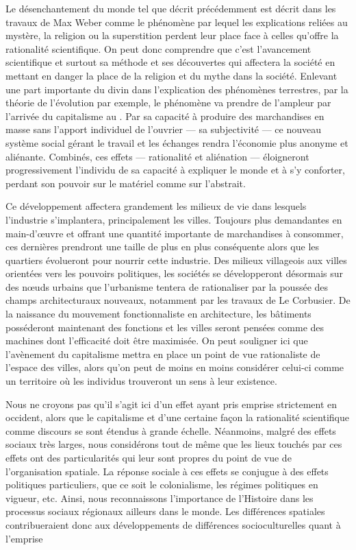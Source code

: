 Le désenchantement du monde tel que décrit précédemment est décrit dans les travaux de Max Weber comme le phénomène par lequel les explications reliées au mystère, la religion ou la superstition perdent leur place face à celles qu'offre la rationalité scientifique.
On peut donc comprendre que c'est l'avancement scientifique et surtout sa méthode et ses découvertes qui affectera la société en mettant en danger la place de la religion et du mythe dans la société.
Enlevant une part importante du divin dans l'explication des phénomènes terrestres, par la théorie de l'évolution par exemple, le phénomène va prendre de l'ampleur par l'arrivée du capitalisme au .
Par sa capacité à produire des marchandises en masse sans l'apport individuel de l'ouvrier --- sa subjectivité --- ce nouveau système social gérant le travail et les échanges rendra l'économie plus anonyme et aliénante.
Combinés, ces effets --- rationalité et aliénation --- éloigneront progressivement l'individu de sa capacité à expliquer le monde et à s'y conforter, perdant son pouvoir sur le matériel comme sur l'abstrait.

Ce développement affectera grandement les milieux de vie dans lesquels l'industrie s'implantera, principalement les villes.
Toujours plus demandantes en main-d’œuvre et offrant une quantité importante de marchandises à consommer, ces dernières prendront une taille de plus en plus conséquente alors que les quartiers évolueront pour nourrir cette industrie.
Des milieux villageois aux villes orientées vers les pouvoirs politiques, les sociétés se développeront désormais sur des nœuds urbains que l'urbanisme tentera de rationaliser par la poussée des champs architecturaux nouveaux, notamment par les travaux de Le Corbusier.
De la naissance du mouvement fonctionnaliste en architecture, les bâtiments posséderont maintenant des fonctions et les villes seront pensées comme des machines dont l'efficacité doit être maximisée\missref{}.
On peut souligner ici que l'avènement du capitalisme mettra en place un point de vue rationaliste de l'espace des villes, alors qu'on peut de moins en moins considérer celui-ci comme un territoire où les individus trouveront un sens à leur existence.

Nous ne croyons pas qu'il s'agit ici d'un effet ayant pris emprise strictement en occident, alors que le capitalisme et d'une certaine façon la rationalité scientifique comme discours se sont étendus à grande échelle.
Néanmoins, malgré des effets sociaux très larges, nous considérons tout de même que les lieux touchés par ces effets ont des particularités qui leur sont propres du point de vue de l'organisation spatiale.
La réponse sociale à ces effets se conjugue à des effets politiques particuliers, que ce soit le colonialisme, les régimes politiques en vigueur, etc.
Ainsi, nous reconnaissons l'importance de l'Histoire dans les processus sociaux régionaux ailleurs dans le monde.
Les différences spatiales contribueraient donc aux développements de différences socioculturelles quant à l'emprise 


